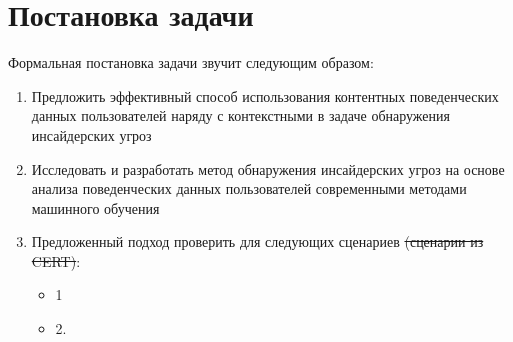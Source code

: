\section{Постановка задачи}
Формальная постановка задачи звучит следующим образом:
\begin{enumerate}
\item Предложить эффективный способ использования контентных поведенческих данных пользователей наряду с контекстными в задаче обнаружения инсайдерских угроз
\item Исследовать и разработать метод обнаружения инсайдерских угроз на основе анализа поведенческих данных пользователей современными методами машинного обучения
\item Предложенный подход проверить для следующих сценариев \sout{(сценарии из CERT)}:
\begin{itemize}
\item 1
\item 2.
\end{itemize}
\end{enumerate}
\clearpage